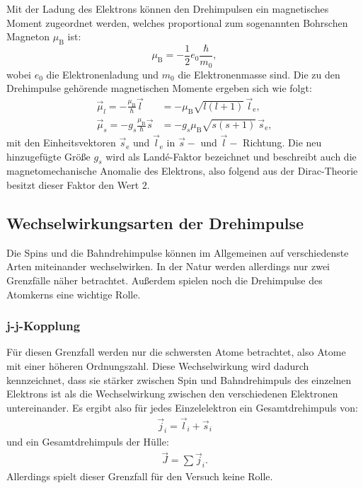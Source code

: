 \documentclass{article}
\begin{document}
	Mit der Ladung des Elektrons können den Drehimpulsen ein magnetisches Moment zugeordnet werden, welches proportional zum sogenannten Bohrschen Magneton $\mu_\text{B}$ ist:
	\begin{equation}
	\mu_{\text{B}} = -\frac{1}{2} e_0 \frac{\hbar}{m_0},
	\end{equation}
	wobei $e_0$ die Elektronenladung und $m_0$ die Elektronenmasse sind. Die zu den Drehimpulse gehörende magnetischen Momente ergeben sich wie folgt:
	\begin{align}
	\vec{\mu}_l=-\frac{\mu_\text{B}}{\hbar}\vec{l}&=-\mu_\text{B}\sqrt{l(l+1)}\,\vec{l}_\text{e},\\
	\vec{\mu}_s=-g_s\frac{\mu_\text{B}}{\hbar}\vec{s}&=-g_s\mu_\text{B}\sqrt{s(s+1)}\,\vec{s}_\text{e},
	\end{align}
	mit den Einheitsvektoren $\vec{s}_\text{e}$ und $\vec{l}_\text{e}$ in $\vec{s}-$ und $\vec{l}-$ Richtung. Die neu hinzugefügte Größe $g_s$ wird als Landé-Faktor bezeichnet und beschreibt auch die magnetomechanische Anomalie des Elektrons, also folgend aus der Dirac-Theorie besitzt dieser Faktor den Wert $2$.
	
	\subsection{Wechselwirkungsarten der Drehimpulse}
	\label{sec:Wechselwirkungen}
	Die Spins und die Bahndrehimpulse können im Allgemeinen auf verschiedenste Arten miteinander wechselwirken. In der Natur werden allerdings nur zwei Grenzfälle näher betrachtet. Außerdem spielen noch die Drehimpulse des Atomkerns eine wichtige Rolle.
	
	\subsubsection{j-j-Kopplung}
	Für diesen Grenzfall werden nur die schwersten Atome betrachtet, also Atome mit einer höheren Ordnungszahl. Diese Wechselwirkung wird dadurch kennzeichnet, dass sie stärker zwischen Spin und Bahndrehimpuls des einzelnen Elektrons ist als die Wechselwirkung zwischen den verschiedenen Elektronen untereinander. Es ergibt also für jedes Einzelelektron ein Gesamtdrehimpuls von:
	\begin{align}
	\vec{j}_i=\vec{l}_i+\vec{s}_i
	\end{align}
	und ein Gesamtdrehimpuls der Hülle:
	\begin{align}
	\vec{J}=\sum\vec{j}_i.
	\end{align}
	Allerdings spielt dieser Grenzfall für den Versuch keine Rolle.
	
\end{document}
